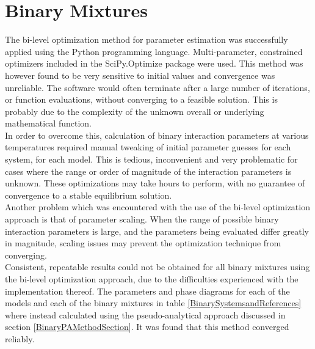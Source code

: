 
\section{Binary Mixtures}

The bi-level optimization method for parameter estimation was successfully applied using the Python programming language. Multi-parameter, constrained optimizers included in the SciPy.Optimize package were used. This method was however found to be very sensitive to initial values and convergence was unreliable. The software would often terminate after a large number of iterations, or function evaluations, without converging to a feasible solution. This is probably due to the complexity of the unknown overall or underlying mathematical function.\\

In order to overcome this, calculation of binary interaction parameters at various temperatures required manual tweaking of initial parameter guesses for each system, for each model. This is tedious, inconvenient and very problematic for cases where the range or order of magnitude of the interaction parameters is unknown. These optimizations may take hours to perform, with no guarantee of convergence to a stable equilibrium solution.\\

Another problem which was encountered with the use of the bi-level optimization approach is that of parameter scaling. When the range of possible binary interaction parameters is large, and the parameters being evaluated differ greatly in magnitude, scaling issues may prevent the optimization technique from converging.\\

Consistent, repeatable results could not be obtained for all binary mixtures using the bi-level optimization approach, due to the difficulties experienced with the implementation thereof. The parameters and phase diagrams for each of the models and each of the binary mixtures in table \ref{BinarySystemsandReferences} where instead calculated using the pseudo-analytical approach discussed in section \ref{BinaryPAMethodSection}. It was found that this method converged reliably.\\

